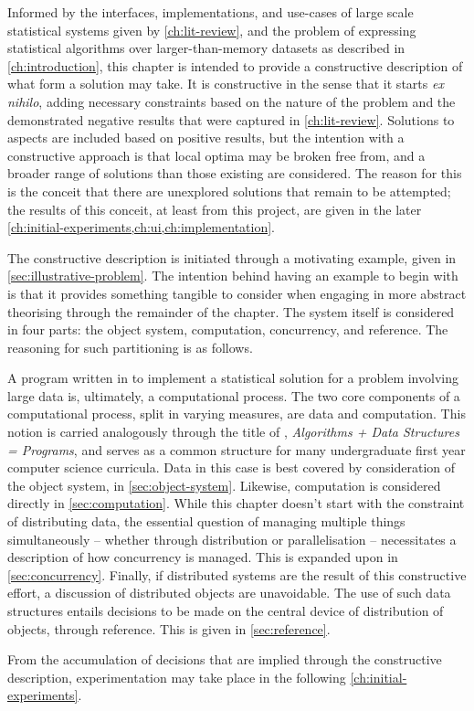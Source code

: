 Informed by the interfaces, implementations, and use-cases of large scale statistical systems given by \cref{ch:lit-review}, and the problem of expressing statistical algorithms over larger-than-memory datasets as described in \cref{ch:introduction}, this chapter is intended to provide a constructive description of what form a solution may take.
It is constructive in the sense that it starts \textit{ex nihilo}, adding necessary constraints based on the nature of the problem and the demonstrated negative results that were captured in \cref{ch:lit-review}.
Solutions to aspects are included based on positive results, but the intention with a constructive approach is that local optima may be broken free from, and a broader range of solutions than those existing are considered.
The reason for this is the conceit that there are unexplored solutions that remain to be attempted; the results of this conceit, at least from this project, are given in the later \cref{ch:initial-experiments,ch:ui,ch:implementation}.

The constructive description is initiated through a motivating example, given in \cref{sec:illustrative-problem}.
The intention behind having an example to begin with is that it provides something tangible to consider when engaging in more abstract theorising through the remainder of the chapter.
The system itself is considered in four parts: the object system, computation, concurrency, and reference.
The reasoning for such partitioning is as follows.

A program written in \R{} to implement a statistical solution for a problem involving large data is, ultimately, a computational process.
The two core components of a computational process, split in varying measures, are data and computation\cite{abelson1996structure}.
This notion is carried analogously through the title of \textcite{wirth1985algorithms}, \textit{Algorithms + Data Structures = Programs}, and serves as a common structure for many undergraduate first year computer science curricula.
Data in this case is best covered by consideration of the object system, in \cref{sec:object-system}.
Likewise, computation is considered directly in \cref{sec:computation}.
While this chapter doesn't start with the constraint of distributing data, the essential question of managing multiple things simultaneously -- whether through distribution or parallelisation -- necessitates a description of how concurrency is managed.
This is expanded upon in \cref{sec:concurrency}.
Finally, if distributed systems are the result of this constructive effort, a discussion of distributed objects are unavoidable.
The use of such data structures entails decisions to be made on the central device of distribution of objects, through reference.
This is given in \cref{sec:reference}.

From the accumulation of decisions that are implied through the constructive description, experimentation may take place in the following \cref{ch:initial-experiments}.
